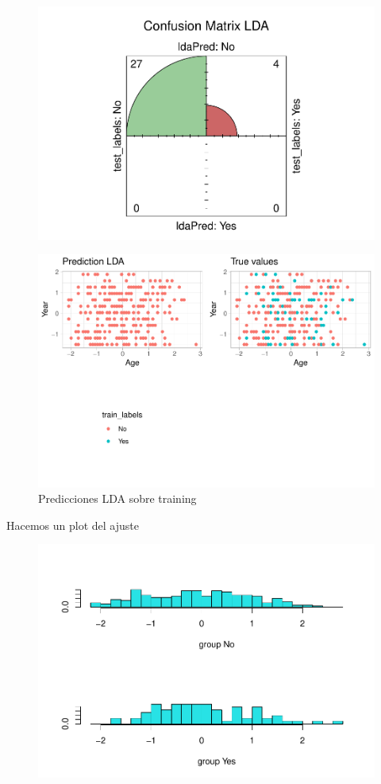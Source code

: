 \begin{figure}[H]\center\includegraphics[width=.9\linewidth]{img/Clasificacion_files/figure-latex/unnamed-chunk-23-1}\caption{}\end{figure}

\begin{figure}[H]\center\includegraphics[width=.9\linewidth]{img/Clasificacion_files/figure-latex/unnamed-chunk-24-1}\caption{Predicciones LDA sobre training}\end{figure}

Hacemos un plot del ajuste

\begin{figure}[H]\center\includegraphics[width=.9\linewidth]{img/Clasificacion_files/figure-latex/unnamed-chunk-25-1}\caption{}\end{figure}

